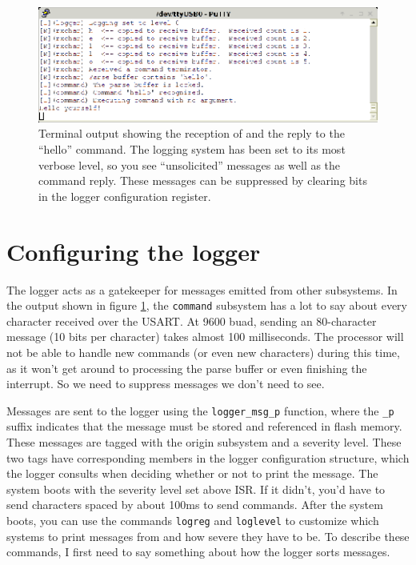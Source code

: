 \begin{figure}[ht]
    \begin{center}
        \includegraphics[clip,scale=2]{pngs/hellotrace.eps}
        \caption{Terminal output showing the reception of and the reply to the ``hello'' command.  The logging system has been set to its most verbose level, so you see ``unsolicited'' messages as well as the command reply.  These messages can be suppressed by clearing bits in the logger configuration register.\label{fig:hellotrace}}
    \end{center}
\end{figure}

\section{Configuring the logger}
The logger acts as a gatekeeper for messages emitted from other subsystems.  In the output shown in figure \ref{fig:hellotrace}, the \texttt{command} subsystem has a lot to say about every character received over the USART.  At 9600 buad, sending an 80-character message (10 bits per character) takes almost 100 milliseconds.  The processor will not be able to handle new commands (or even new characters) during this time, as it won't get around to processing the parse buffer or even finishing the interrupt.  So we need to suppress messages we don't need to see.  

Messages are sent to the logger using the \texttt{logger\_msg\_p} function, where the \texttt{\_p} suffix indicates that the message must be stored and referenced in flash memory.  These messages are tagged with the origin subsystem and a severity level.  These two tags have corresponding members in the logger configuration structure, which the logger consults when deciding whether or not to print the message.  The system boots with the severity level set above ISR.  If it didn't, you'd have to send characters spaced by about 100ms to send commands.  After the system boots, you can use the commands \texttt{logreg} and \texttt{loglevel} to customize which systems to print messages from and how severe they have to be.  To describe these commands, I first need to say something about how the logger sorts messages.

